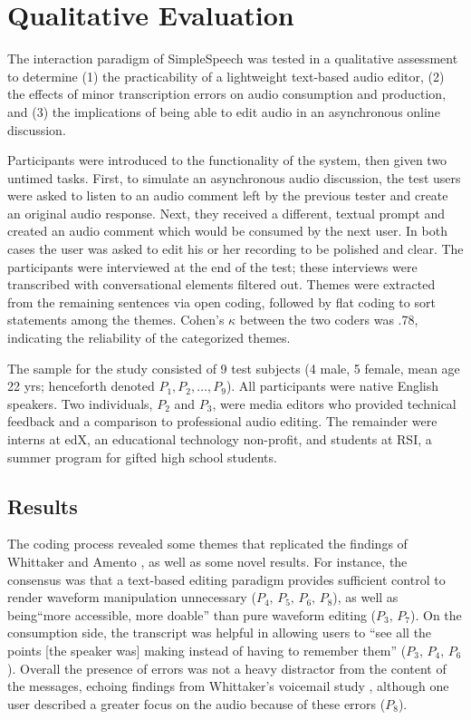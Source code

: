 \section{Qualitative Evaluation}

The interaction paradigm of SimpleSpeech was tested in a qualitative assessment to determine (1) the practicability of a lightweight text-based audio editor, (2) the effects of minor transcription errors on audio consumption and production, and (3) the implications of being able to edit audio in an asynchronous online discussion.

Participants were introduced to the functionality of the system, then given two untimed tasks. 
First, to simulate an asynchronous audio discussion, the test users were asked to listen to an audio comment left by the previous tester and create an original audio response. 
Next, they received a different, textual prompt and created an audio comment which would be consumed by the next user. 
In both cases the user was asked to edit his or her recording to be polished and clear.
The participants were interviewed at the end of the test; these interviews were transcribed with conversational elements filtered out.
Themes were extracted from the remaining sentences via open coding, followed by flat coding to sort statements among the themes. 
Cohen's $\kappa$ between the two coders was .78, indicating the reliability of the categorized themes.

The sample for the study consisted of 9 test subjects (4 male, 5 female, mean age 22 yrs; henceforth denoted $P_1, P_2, \ldots, P_9$). 
All participants were native English speakers. 
Two individuals, $P_2$ and $P_3$, were media editors who provided technical feedback and a comparison to professional audio editing.
The remainder were interns at edX, an educational technology non-profit, and students at RSI, a summer program for gifted high school students.

\subsection{Results}
The coding process revealed some themes that replicated the findings of Whittaker and Amento \cite{whittaker_semantic}, as well as some novel results.
For instance, the consensus was that a text-based editing paradigm provides sufficient control to render waveform manipulation unnecessary ($P_4,\,P_5,\,P_6,\,P_8$), as well as being``more accessible, more doable'' than pure waveform editing ($P_3,\,P_7$).
On the consumption side, the transcript was helpful in allowing users to ``see all the points [the speaker was] making instead of having to remember them'' ($P_3,\,P_4,\,P_6$).
Overall the presence of errors was not a heavy distractor from the content of the messages, echoing findings from Whittaker's voicemail study \cite{whittaker}, although one user described a greater focus on the audio because of these errors ($P_8$).

